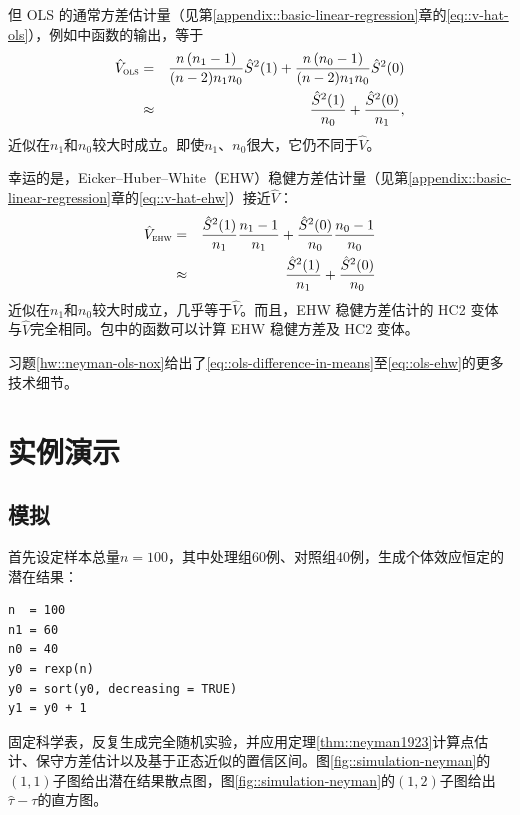 但 OLS 的通常方差估计量（见第\ref{appendix::basic-linear-regression}章的\eqref{eq::v-hat-ols}），例如中函数的输出，等于
\begin{eqnarray}
\label{eq::ols-se}
\hat V_\textsc{ols} &=& \frac{n\left(n_1 -1\right)}{( n-2 ) n_1  n_0 } \hat S^2(1) +\frac{n\left(n_0 -1\right)}{( n-2 ) n_1  n_0 } \hat S^2(0)\\
\nonumber &\approx& \frac{\hat S^2(1)}{n_0 }+\frac{ \hat S^2(0) }{n_1 },
\end{eqnarray}
近似在$ n_1 $和$ n_0 $较大时成立。即使$ n_1 $、$ n_0 $很大，它仍不同于$\hat{V}$。 


幸运的是，Eicker--Huber--White（EHW）稳健方差估计量（见第\ref{appendix::basic-linear-regression}章的\eqref{eq::v-hat-ehw}）接近$\hat{V}$：
\begin{eqnarray}
\label{eq::ols-ehw}
\hat V_\textsc{ehw} &=& \frac{\hat S^2(1)}{n_1 } \frac{n_1 -1}{n_1 }+\frac{\hat S^2(0)}{n_0 } \frac{n_0 -1}{n_0 } \\
\nonumber &\approx& \frac{ \hat S^2(1)  }{n_1 }+\frac{ \hat S^2(0) }{n_0 }
\end{eqnarray}
近似在$ n_1 $和$ n_0 $较大时成立，几乎等于$\hat{V}$。而且，EHW 稳健方差估计的 HC2 变体与$\hat{V}$完全相同。包中的函数可以计算 EHW 稳健方差及 HC2 变体。 

习题\ref{hw::neyman-ols-nox}给出了\eqref{eq::ols-difference-in-means}至\eqref{eq::ols-ehw}的更多技术细节。 
 



 

 
\section{实例演示} 


\subsection{模拟}
\label{sec::simulation-neyman-formula}



首先设定样本总量$n=100$，其中处理组$60$例、对照组$40$例，生成个体效应恒定的潜在结果： 
\begin{lstlisting}
n  = 100
n1 = 60
n0 = 40
y0 = rexp(n)
y0 = sort(y0, decreasing = TRUE)
y1 = y0 + 1
 \end{lstlisting}
固定科学表，反复生成完全随机实验，并应用定理\ref{thm::neyman1923}计算点估计、保守方差估计以及基于正态近似的置信区间。图\ref{fig::simulation-neyman}的$(1,1)$子图给出潜在结果散点图，图\ref{fig::simulation-neyman}的$(1,2)$子图给出$\hat{\tau} - \tau$的直方图。 

